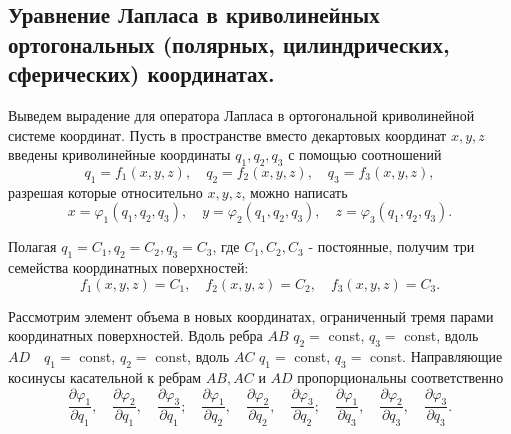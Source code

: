 \subsection{Уравнение Лапласа в криволинейных ортогональных (полярных, цилиндрических, сферических) координатах.}
\label{sec:14}



Выведем вырадение для оператора Лапласа в ортогональной криволинейной системе координат. Пусть в пространстве вместо декартовых координат $x, y, z$ введены криволинейные координаты $q_{1}, q_{2}, q_{3}$ с помощью соотношений
\[
q_{1}=f_{1}(x, y, z), \quad q_{2}=f_{2}(x, y, z), \quad q_{3}=f_{3}(x, y, z),
\]
разрешая которые относительно $x, y, z$, можно написать
\[
x=\varphi_{1}\left(q_{1}, q_{2}, q_{3}\right), \quad y=\varphi_{2}\left(q_{1}, q_{2}, q_{3}\right), \quad z=\varphi_{3}\left(q_{1}, q_{2}, q_{3}\right) .
\]

Полагая $q_{1}=C_{1}, q_{2}=C_{2}, q_{3}=C_{3}$, где $C_{1}, C_{2}, C_{3}$ - постоянные, получим три семейства координатных поверхностей:
\[
f_{1}(x, y, z)=C_{1}, \quad f_{2}(x, y, z)=C_{2}, \quad f_{3}(x, y, z)=C_{3} .
\]
\begin{figure}[h!]
	\centering
\end{figure}

Рассмотрим элемент объема в новых координатах, ограниченный тремя парами координатных поверхностей. Вдоль ребра $A B$ $q_{2}=$ const, $q_{3}=$ const, вдоль $A D \quad q_{1}=$ const, $q_{2}=$ const, вдоль $A C$ $q_{1}=$ const, $q_{3}=$ const. Направляющие косинусы касательной к ребрам $A B, A C$ и $A D$ пропорциональны соответственно
\[
\frac{\partial \varphi_{1}}{\partial q_{1}}, \quad \frac{\partial \varphi_{2}}{\partial q_{1}}, \quad \frac{\partial \varphi_{3}}{\partial q_{1}} ; \quad \frac{\partial \varphi_{1}}{\partial q_{2}}, \quad \frac{\partial \varphi_{2}}{\partial q_{2}}, \quad \frac{\partial \varphi_{3}}{\partial q_{2}} ; \quad \frac{\partial \varphi_{1}}{\partial q_{3}}, \quad \frac{\partial \varphi_{2}}{\partial q_{3}}, \quad \frac{\partial \varphi_{3}}{\partial q_{3}} .
\]

